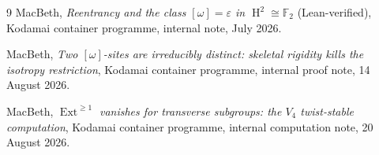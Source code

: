 \documentclass[11pt]{amsart}
\theoremstyle{plain}
\theoremstyle{definition}
\DeclareMathOperator{\Ext}{Ext}
\DeclareMathOperator{\Hh}{H}
\begin{document}
\begin{thebibliography}{9}
MacBeth,
\emph{Reentrancy and the class $[\omega]=\varepsilon$ in $\Hh^2\cong\mathbb{F}_2$}
(Lean-verified),
Kodamai container programme, internal note, July 2026.

MacBeth,
\emph{Two $[\omega]$-sites are irreducibly distinct: skeletal rigidity kills the isotropy
restriction},
Kodamai container programme, internal proof note, 14 August 2026.

MacBeth,
\emph{$\Ext^{\ge 1}$ vanishes for transverse subgroups: the $V_4$ twist-stable
computation},
Kodamai container programme, internal computation note, 20 August 2026.

\end{thebibliography}
\end{document}
